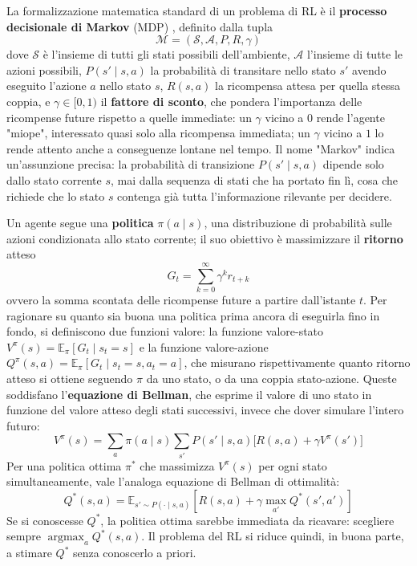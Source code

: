 La formalizzazione matematica standard di un problema di RL è il
\textbf{processo decisionale di Markov} (MDP) \citep{suttonbarto2018},
definito dalla tupla
\[\mathcal{M} = (\mathcal{S}, \mathcal{A}, P, R, \gamma)\]
dove $\mathcal{S}$ è l'insieme di tutti gli stati possibili dell'ambiente,
$\mathcal{A}$ l'insieme di tutte le azioni possibili, $P(s' \mid s,a)$ la
probabilità di transitare nello stato $s'$ avendo eseguito l'azione $a$
nello stato $s$, $R(s,a)$ la ricompensa attesa per quella stessa coppia, e
$\gamma \in [0,1)$ il \textbf{fattore di sconto}, che pondera l'importanza
delle ricompense future rispetto a quelle immediate: un $\gamma$ vicino a
$0$ rende l'agente "miope", interessato quasi solo alla ricompensa
immediata; un $\gamma$ vicino a $1$ lo rende attento anche a conseguenze
lontane nel tempo. Il nome "Markov" indica un'assunzione precisa: la
probabilità di transizione $P(s'\mid s,a)$ dipende solo dallo stato
corrente $s$, mai dalla sequenza di stati che ha portato fin lì, cosa che
richiede che lo stato $s$ contenga già tutta l'informazione rilevante per
decidere.

Un agente segue una \textbf{politica} $\pi(a \mid s)$, una distribuzione
di probabilità sulle azioni condizionata allo stato corrente; il suo
obiettivo è massimizzare il \textbf{ritorno} atteso
\[G_t = \sum_{k=0}^{\infty} \gamma^k r_{t+k}\]
ovvero la somma scontata delle ricompense future a partire dall'istante
$t$. Per ragionare su quanto sia buona una politica prima ancora di
eseguirla fino in fondo, si definiscono due funzioni valore: la
funzione valore-stato $V^\pi(s) = \mathbb{E}_\pi[G_t \mid s_t = s]$ e la
funzione valore-azione $Q^\pi(s,a) = \mathbb{E}_\pi[G_t \mid s_t=s,
a_t=a]$, che misurano rispettivamente quanto ritorno atteso si ottiene
seguendo $\pi$ da uno stato, o da una coppia stato-azione. Queste
soddisfano l'\textbf{equazione di Bellman}, che esprime il valore di uno
stato in funzione del valore atteso degli stati successivi, invece che
dover simulare l'intero futuro:
\begin{equation}
  V^\pi(s) = \sum_a \pi(a\mid s) \sum_{s'} P(s'\mid s,a) \big[R(s,a) + \gamma V^\pi(s')\big]
\end{equation}
Per una politica ottima $\pi^*$ che massimizza $V^\pi(s)$ per ogni stato
simultaneamente, vale l'analoga equazione di Bellman di ottimalità:
\begin{equation}
  Q^*(s,a) = \mathbb{E}_{s' \sim P(\cdot \mid s,a)}\left[
    R(s,a) + \gamma \max_{a'} Q^*(s', a')
  \right]
  \label{eq:bellman-optimal}
\end{equation}
Se si conoscesse $Q^*$, la politica ottima sarebbe immediata da ricavare:
scegliere sempre $\operatorname*{argmax}_a Q^*(s,a)$. Il problema del RL
si riduce quindi, in buona parte, a stimare $Q^*$ senza conoscerlo a
priori.

